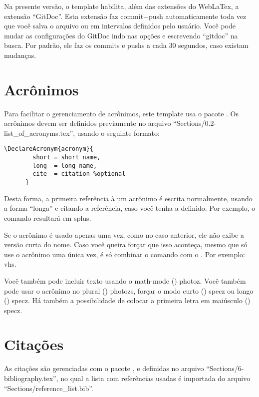     Na presente versão, o template habilita, além das extensões do WebLaTex, a extensão ``GitDoc''. Esta extensão faz commit+push automaticamente toda vez que você salva o arquivo ou em intervalos definidos pelo usuário. Você pode mudar as configurações do GitDoc indo nas opções e escrevendo ``gitdoc'' na busca. Por padrão, ele faz os commits e pushs a cada 30 segundos, caso existam mudanças.

  \section{Acrônimos}
    Para facilitar o gerenciamento de acrônimos, este template usa o pacote . Os acrônimos devem ser definidos previamente no arquivo ``Sections/0.2-list\_of\_acronyms.tex'', usando o seguinte formato:
    \begin{lstlisting}[autogobble]
      \DeclareAcronym{acronym}{
        short = short name,
        long  = long name,
        cite  = citation %optional
      }
    \end{lstlisting}

    Desta forma, a primeira referência à um acrônimo é escrita normalmente, usando a forma ``longa'' e citando a referência, caso você tenha a definido. Por exemplo, o comando  resultará em \ac{splus}.

    Se o acrônimo é usado apenas uma vez, como no caso anterior, ele não exibe a versão curta do nome. Caso você queira forçar que isso aconteça, mesmo que só use o acrônimo uma única vez, é só combinar o comando  com o . Por exemplo: \ac{vhs}.

    Você também pode incluir texto usando o math-mode () \ac{photoz}. Você também pode usar o acrônimo no plural () \acp{photoz}, forçar o modo curto () \acs{specz} ou longo () \acl{specz}. Há também a possibilidade de colocar a primeira letra em maiúsculo () \Ac{specz}.

  \section{Citações}
    As citações são gerenciadas com o pacote , e definidas no arquivo ``Sections/6-bibliography.tex'', no qual a lista com referências usadas é importada do arquivo ``Sections/reference\_list.bib''. 


